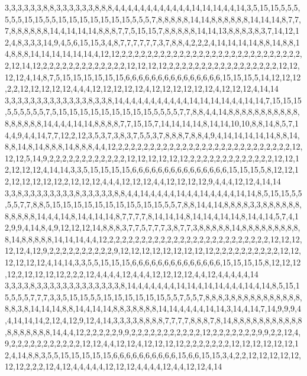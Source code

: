 3,3,3,3,3,3,8,8,3,3,3,3,3,3,8,8,8,4,4,4,4,4,4,4,4,4,4,4,4,14,14,14,4,4,14,3,5,15,15,5,5,5,5,5,5,15,15,5,5,15,15,15,15,15,15,15,5,5,5,7,8,8,8,8,8,14,14,8,8,8,8,8,8,14,14,14,8,7,7,7,8,8,8,8,8,8,14,4,14,14,14,8,8,8,7,7,5,15,15,7,8,8,8,8,8,14,14,13,8,8,8,3,8,3,7,14,12,12,4,8,3,3,3,14,9,4,5,6,15,15,3,4,8,7,7,7,7,7,7,3,7,8,8,4,2,2,2,4,14,14,14,14,8,8,14,8,8,14,8,8,8,14,14,14,14,14,14,4,12,12,2,2,2,2,2,2,2,2,2,2,2,2,2,2,2,2,2,2,2,2,2,2,2,2,2,2,2,2,2,12,14,12,2,2,2,2,2,2,2,2,2,2,2,2,2,12,12,12,12,2,2,2,2,2,2,2,2,2,2,2,2,2,2,2,2,2,12,12,12,12,4,14,8,7,5,15,15,15,15,15,15,6,6,6,6,6,6,6,6,6,6,6,6,6,6,6,15,15,15,5,14,12,12,12,2,2,12,12,12,12,12,4,4,4,12,12,12,12,12,4,12,12,12,12,12,12,4,12,12,12,4,14,14
3,3,3,3,3,3,3,3,3,3,3,3,3,8,3,3,8,14,4,4,4,4,4,4,4,4,4,4,14,14,14,14,4,4,14,14,7,15,15,15,5,5,5,5,5,5,7,5,15,15,15,15,15,15,15,15,15,5,5,5,5,7,7,8,8,4,4,14,8,8,8,8,8,8,8,8,8,8,8,8,8,8,8,8,8,14,4,4,4,14,14,8,8,8,8,7,7,15,15,7,14,14,14,14,8,14,14,10,10,8,8,14,8,5,7,14,4,9,4,4,14,7,7,12,2,12,3,5,3,7,3,8,3,7,5,5,3,7,8,8,8,7,8,8,4,9,4,14,14,14,14,14,8,8,14,8,8,14,8,14,8,8,8,14,8,8,8,4,4,12,2,2,2,2,2,2,2,2,2,2,2,2,2,2,2,2,2,2,2,2,2,2,2,2,2,2,2,12,12,12,5,14,9,2,2,2,2,2,2,2,2,2,2,2,2,12,12,12,12,12,12,2,2,2,2,2,2,2,2,2,2,2,2,2,12,12,12,12,12,12,4,14,14,3,3,5,15,15,15,15,6,6,6,6,6,6,6,6,6,6,6,6,6,6,6,15,15,15,5,8,12,12,12,12,12,12,12,12,2,12,12,12,4,4,4,12,12,12,4,4,12,12,12,12,9,4,4,4,12,12,4,14,14
3,3,8,3,3,3,3,3,3,3,3,8,3,3,3,3,3,8,8,4,4,14,4,4,4,4,14,4,4,14,4,4,4,4,14,14,8,5,15,15,5,5,5,5,7,7,8,8,5,15,15,15,15,15,15,15,15,5,15,15,5,5,7,8,8,14,4,14,8,8,8,8,3,3,8,8,8,8,8,8,8,8,8,8,8,14,4,4,14,8,14,4,14,14,8,7,7,7,7,8,14,14,14,8,14,14,4,14,14,8,14,4,14,5,7,4,12,9,9,4,14,8,4,9,12,12,12,14,8,8,8,3,7,7,5,7,7,7,3,8,7,7,3,8,8,8,8,8,14,8,8,8,8,8,8,8,8,8,8,14,8,8,8,8,8,14,14,14,4,4,12,2,2,2,2,2,2,2,2,2,2,2,2,2,2,2,2,2,2,2,2,2,2,2,2,2,12,12,12,12,12,4,12,9,2,2,2,2,2,2,2,2,2,2,9,12,12,12,12,12,12,12,12,12,2,2,2,2,2,2,2,2,2,2,12,12,12,12,12,12,4,14,14,3,3,5,5,15,15,15,6,6,6,6,6,6,6,6,6,6,6,6,6,6,15,15,15,15,8,12,12,12,12,2,12,12,12,12,2,2,2,12,4,4,4,4,12,4,4,4,12,12,12,12,4,4,12,4,4,4,4,4,14
3,3,3,3,8,3,3,3,3,3,3,3,3,3,3,3,3,3,8,14,4,4,4,4,4,4,14,14,4,14,14,4,4,4,14,4,14,8,5,15,15,5,5,5,7,7,7,3,3,5,15,15,5,5,15,15,15,15,15,15,5,5,7,5,5,7,8,8,8,3,8,8,8,8,8,8,8,8,8,8,8,8,8,3,8,14,14,14,8,8,14,4,14,14,8,8,3,8,8,8,8,14,14,4,4,4,4,14,14,3,14,4,14,7,14,9,9,9,4,4,14,14,14,2,12,4,12,9,12,4,14,3,3,3,3,8,8,8,8,7,7,7,7,8,8,8,7,8,14,8,8,8,8,8,8,8,8,8,8,8,8,8,8,8,8,8,8,14,4,4,12,2,2,2,2,2,9,9,2,2,2,2,2,2,2,2,2,2,2,12,2,2,2,2,2,2,2,9,9,2,2,12,4,9,2,2,2,2,2,2,2,2,2,2,2,12,12,4,4,12,12,4,12,12,12,12,2,2,2,2,2,2,2,12,12,12,12,12,12,12,4,14,8,8,3,5,5,15,15,15,15,15,6,6,6,6,6,6,6,6,6,6,15,6,6,15,15,3,4,2,2,12,12,12,12,12,12,12,2,2,2,12,4,12,4,4,4,4,4,12,12,12,4,4,4,4,12,4,4,12,12,4,14
